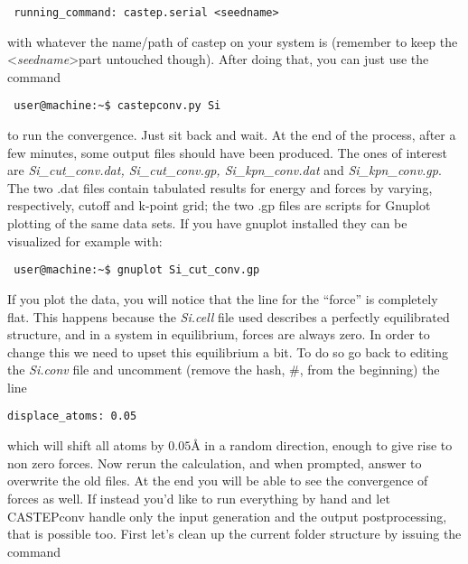 \documentclass[10pt]{article}
\begin{document}
\begin{lstlisting}
 running_command: castep.serial <seedname>
\end{lstlisting}

with whatever the name/path of castep on your system is (remember to keep the \textless \textit{seedname}\textgreater part untouched though). After doing that, you can just use the command

\begin{lstlisting}
 user@machine:~$ castepconv.py Si
\end{lstlisting}

to run the convergence. Just sit back and wait. At the end of the process, after a few minutes, some output files should have been produced. The ones of interest are \textit{Si\_cut\_conv.dat, Si\_cut\_conv.gp, Si\_kpn\_conv.dat} and \textit{Si\_kpn\_conv.gp}. The two .dat files contain tabulated results for energy and forces by varying, respectively, cutoff and k-point grid; the two .gp files are scripts for Gnuplot plotting of the same data sets. If you have gnuplot installed they can be visualized for example with:

\begin{lstlisting}
 user@machine:~$ gnuplot Si_cut_conv.gp
\end{lstlisting}

If you plot the data, you will notice that the line for the ``force'' is completely flat. This happens because the \textit{Si.cell} file used describes a perfectly equilibrated structure, and in a system in equilibrium, forces are always zero. In order to change this we need to upset this equilibrium a bit. To do so go back to editing the \textit{Si.conv} file and uncomment (remove the hash, \#, from the beginning) the line

\begin{lstlisting}
displace_atoms: 0.05
\end{lstlisting}

which will shift all atoms by $0.05 $\AA{} in a random direction, enough to give rise to non zero forces. Now rerun the calculation, and when prompted, answer to overwrite the old files. At the end you will be able to see the convergence of forces as well.\newline
If instead you'd like to run everything by hand and let CASTEPconv handle only the input generation and the output postprocessing, that is possible too. First let's clean up the current folder structure by issuing the command
\end{document}
